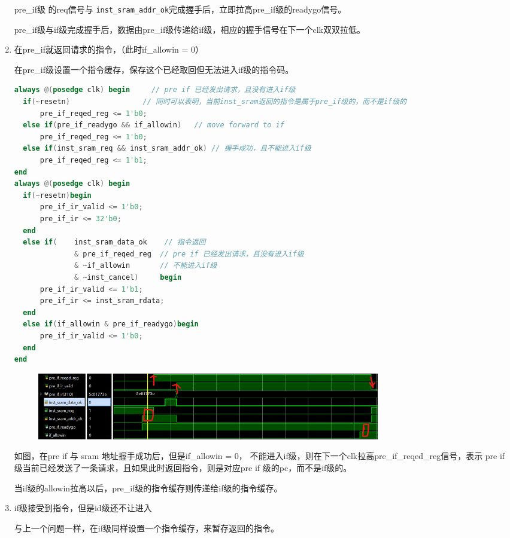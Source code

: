 \documentclass[11pt]{article}
\begin{document}
\begin{enumerate}
pre\_if级 的req信号与 \verb|inst_sram_addr_ok|完成握手后，立即拉高pre\_if级的readygo信号。

pre\_if级与if级完成握手后，数据由pre\_if级传递给if级，相应的握手信号在下一个clk双双拉低。

\item 在pre\_if就返回请求的指令，（此时if_allowin = 0）

在pre\_if级设置一个指令缓存，保存这个已经取回但无法进入if级的指令码。


\begin{lstlisting}[language=verilog]
  always @(posedge clk) begin     // pre if 已经发出请求，且没有进入if级
  if(~resetn)                 // 同时可以表明，当前inst_sram返回的指令是属于pre_if级的，而不是if级的
      pre_if_reqed_reg <= 1'b0;
  else if(pre_if_readygo && if_allowin)   // move forward to if
      pre_if_reqed_reg <= 1'b0;
  else if(inst_sram_req && inst_sram_addr_ok) // 握手成功，且不能进入if级
      pre_if_reqed_reg <= 1'b1;
end
always @(posedge clk) begin
  if(~resetn)begin
      pre_if_ir_valid <= 1'b0;
      pre_if_ir <= 32'b0;
  end
  else if(    inst_sram_data_ok    // 指令返回
              & pre_if_reqed_reg  // pre if 已经发出请求，且没有进入if级
              & ~if_allowin       // 不能进入if级
              & ~inst_cancel)     begin   
      pre_if_ir_valid <= 1'b1;
      pre_if_ir <= inst_sram_rdata;
  end
  else if(if_allowin & pre_if_readygo)begin
      pre_if_ir_valid <= 1'b0;
  end
end
\end{lstlisting}
\begin{figure}[H]
  \centering
  \includegraphics[width=15cm]{fig/fig3.png}
\end{figure}
如图，在pre if 与 sram 地址握手成功后，但是if\_allowin = 0， 不能进入if级，则在下一个clk拉高pre\_if\_reqed\_reg信号，表示
pre if 级当前已经发送了一条请求，且如果此时返回指令，则是对应pre if 级的pc，而不是if级的。

当if级的allowin拉高以后，pre\_if级的指令缓存则传递给if级的指令缓存。


\item if级接受到指令，但是id级还不让进入

与上一个问题一样，在if级同样设置一个指令缓存，来暂存返回的指令。


\end{enumerate}
\end{document}
